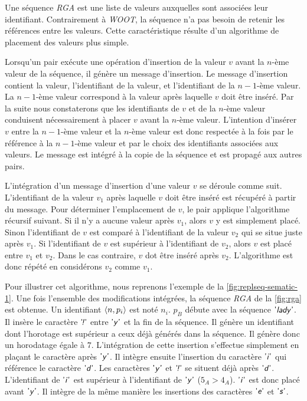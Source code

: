 Une séquence \emph{RGA} est une liste de valeurs auxquelles sont associées leur identifiant.
Contrairement à \emph{WOOT}, la séquence n'a pas besoin de retenir les références entre les valeurs.
Cette caractéristique résulte d'un algorithme de placement des valeurs plus simple.

Lorsqu'un pair exécute une opération d'insertion de la valeur $v$ avant la $n$-ème valeur de la séquence, il génère un message d'insertion.
Le message d'insertion contient la valeur, l'identifiant de la valeur, et l'identifiant de la $n-1$-ème valeur.
La $n-1$-ème valeur correspond à la valeur après laquelle $v$ doit être inséré.
Par la suite nous constaterons que les identifiants de $v$ et de la $n$-ème valeur conduisent nécessairement à placer $v$ avant la $n$-ème valeur.
L'intention d'insérer $v$ entre la $n-1$-ème valeur et la $n$-ème valeur est donc respectée à la fois par le référence à la $n-1$-ème valeur et par le choix des identifiants associées aux valeurs.
Le message est intégré à la copie de la séquence et est propagé aux autres pairs.

L'intégration d'un message d'insertion d'une valeur $v$ se déroule comme suit.
L'identifiant de la valeur $v_1$ après laquelle $v$ doit être inséré est récupéré à partir du message.
Pour déterminer l'emplacement de $v$, le pair applique l'algorithme récursif suivant.
Si il n'y a aucune valeur après $v_1$, alors $v$ y est simplement placé.
Sinon l'identifiant de $v$ est comparé à l'identifiant de la valeur $v_2$ qui se situe juste après $v_1$.
Si l'identifiant de $v$ est supérieur à l'identifiant de $v_2$, alors $v$ est placé entre $v_1$ et $v_2$.
Dans le cas contraire, $v$ dot être inséré après $v_2$.
L'algorithme est donc répété en considérons $v_2$ comme $v_1$.

Pour illustrer cet algorithme, nous reprenons l'exemple de la \autoref{fig:replseq-sematic-1}.
Une fois l'ensemble des modifications intégrées, la séquence \emph{RGA} de la \autoref{fig:rga} est obtenue.
Un identifiant $\tuple*{n, p_i}$ est noté $n_i$.
$p_B$ débute avec la séquence $\textsf{'\textit{lady}'}$.
Il insère le caractère $\textsf{'\textit{\negthinspace!}'}$ entre $\textsf{'\textit{y}'}$ et la fin de la séquence.
Il génère un identifiant dont l'horotage est supérieur a ceux déjà générés dans la séquence.
Il génère donc un horodatage égale à $7$.
L'intégration de cette insertion s'effectue simplement en plaçant le caractère après $\textsf{'\textit{y}'}$.
Il intègre ensuite l'insertion du caractère $\textsf{'\textit{i}'}$ qui référence le caractère $\textsf{'\textit{d}'}$.
Les caractères $\textsf{'\textit{y}'}$ et $\textsf{'\textit{\negthinspace!}'}$ se situent déjà après $\textsf{'\textit{d}'}$.
L'identifiant de $\textsf{'\textit{i}'}$ est supérieur à l'identifiant de $\textsf{'\textit{y}'}$ ($5_A > 4_A$).
$\textsf{'\textit{i}'}$ est donc placé avant $\textsf{'\textit{y}'}$.
Il intègre de la même manière les insertions des caractères $\textsf{'\textit{e}'}$ et $\textsf{'\textit{s}'}$.


